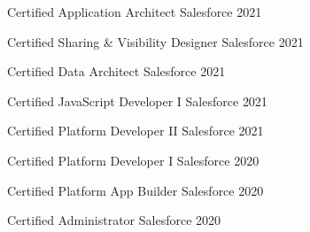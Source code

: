 

\begin{cvhonors}

  \cvhonor
    {Certified Application Architect} %
    {Salesforce} %
    {} %
    {2021} %

  \cvhonor
    {Certified Sharing \& Visibility Designer} %
    {Salesforce} %
    {} %
    {2021} %

  \cvhonor
    {Certified Data Architect} %
    {Salesforce} %
    {} %
    {2021} %

  \cvhonor
    {Certified JavaScript Developer I} %
    {Salesforce} %
    {} %
    {2021} %

  \cvhonor
    {Certified Platform Developer II} %
    {Salesforce} %
    {} %
    {2021} %

  \cvhonor
    {Certified Platform Developer I} %
    {Salesforce} %
    {} %
    {2020} %

  \cvhonor
    {Certified Platform App Builder} %
    {Salesforce} %
    {} %
    {2020} %

  \cvhonor
    {Certified Administrator} %
    {Salesforce} %
    {} %
    {2020} %

\end{cvhonors}
